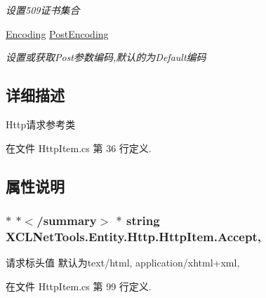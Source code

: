\begin{DoxyCompactItemize}
\begin{DoxyCompactList}\small\item\em 设置509证书集合 \end{DoxyCompactList}\item 
\hyperlink{class_x_c_l_net_tools_1_1_entity_1_1_http_1_1_http_item_aefaad52c96c7c2b692f3470b61cd75eb}{Encoding} \hyperlink{class_x_c_l_net_tools_1_1_entity_1_1_http_1_1_http_item_ab4d3010b05811df9360aa8651d02302a}{Post\-Encoding}
\begin{DoxyCompactList}\small\item\em 设置或获取\-Post参数编码,默认的为\-Default编码 \end{DoxyCompactList}\end{DoxyCompactItemize}


\subsection{详细描述}
Http请求参考类 



在文件 Http\-Item.\-cs 第 36 行定义.



\subsection{属性说明}
\hypertarget{class_x_c_l_net_tools_1_1_entity_1_1_http_1_1_http_item_a1e43938a270466cf6955b4e161cf25fc}{
\subsubsection[{Accept}]{\setlength{\rightskip}{0pt plus 5cm}$\ast$ $\ast$$<$/summary$>$ $\ast$ string X\-C\-L\-Net\-Tools.\-Entity.\-Http.\-Http\-Item.\-Accept\hspace{0.3cm}{\ttfamily [get]}, {\ttfamily [set]}}}\label{class_x_c_l_net_tools_1_1_entity_1_1_http_1_1_http_item_a1e43938a270466cf6955b4e161cf25fc}


请求标头值 默认为text/html, application/xhtml+xml, 



在文件 Http\-Item.\-cs 第 99 行定义.

